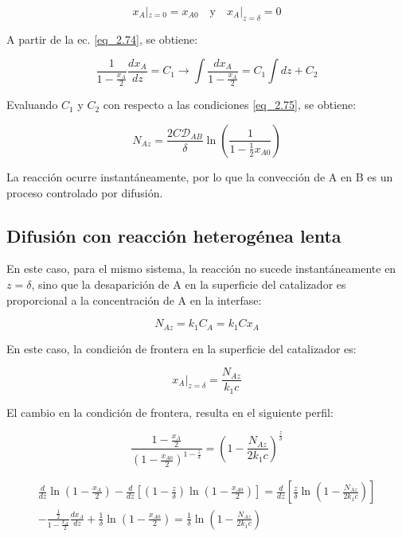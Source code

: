 \begin{equation}
    x_A |_{z=0} = x_{A0}\quad \text{y} \quad x_A |_{z=\delta} = 0
    \label{eq_2.75}
\end{equation}

A partir de la ec. \eqref{eq_2.74}, se obtiene:

\begin{equation*}
    \frac{1}{1-\frac{x_A}{2}}\frac{dx_A}{dz}=C_1\longrightarrow \int\frac{dx_A}{1-\frac{x_A}{2}}=C_1\int dz +C_2
\end{equation*}

Evaluando $C_1$ y $C_2$ con respecto a las condiciones \eqref{eq_2.75}, se obtiene:

\begin{equation}
    N_{Az}=\frac{2C\mathscr{D}_{AB}}{\delta}\ln\left(\frac{1}{1-\frac{1}{2}x_{A0}}\right)
    \label{eq_2.76}
\end{equation}

La reacción ocurre instantáneamente, por lo que la convección de A en B es un proceso controlado por difusión.

\subsection{Difusión con reacción heterogénea lenta}

En este caso, para el mismo sistema, la reacción no sucede instantáneamente en $z=\delta$, sino que la desaparición de A en la superficie del catalizador es proporcional a la concentración de A en la interfase:

\begin{equation}
    N_{Az}=k_1C_A=k_1Cx_A
\end{equation}

En este caso, la condición de frontera en la superficie del catalizador es:

\begin{equation*}
    x_A|_{z=\delta}=\frac{N_{Az}}{k_1c}
\end{equation*}

El cambio en la condición de frontera, resulta en el siguiente perfil:

\begin{equation}
    \frac{1-\frac{x_A}{2}}{(1-\frac{x_{A0}}{2})^{1-\frac{z}{\delta}}}=\left(1-\frac{N_{Az}}{2k_1c}\right)^{\frac{z}{\delta}}
\end{equation}



\begin{equation}
\begin{split}
     \frac{d}{dz}\ln\left(1-\frac{x_A}{2}\right)-\frac{d}{dz}\left[\left(1-\frac{z}{\delta}\right)\ln\left(1-\frac{x_{A0}}{2}\right)\right]=\frac{d}{dz}\left[\frac{z}{\delta}\ln \left(1-\frac{N_{Az}}{2k_1c}\right)\right]\\-\frac{\frac{1}{2}}{1-\frac{x_A}{2}}\frac{dx_A}{dz}+\frac{1}{\delta}\ln \left(1-\frac{x_{A0}}{2}\right)=\frac{1}{\delta}\ln \left(1-\frac{N_{Az}}{2k_1c}\right)   
\end{split}
\label{eq_2.79}
\end{equation}

